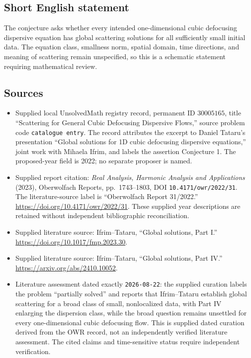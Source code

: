 \documentclass[11pt]{article}
\begin{document}
\subsection{Short English statement}
The conjecture asks whether every intended one-dimensional cubic defocusing dispersive equation has global scattering solutions for all sufficiently small initial data. The equation class, smallness norm, spatial domain, time directions, and meaning of scattering remain unspecified, so this is a schematic statement requiring mathematical review.
\subsection{Sources}
\begin{itemize}
\item Supplied local UnsolvedMath registry record, permanent ID \(30005165\), title ``Scattering for General Cubic Defocusing Dispersive Flows,'' source problem code \texttt{catalogue entry}. The record attributes the excerpt to Daniel Tataru's presentation ``Global solutions for 1D cubic defocusing dispersive equations,'' joint work with Mihaela Ifrim, and labels the assertion Conjecture 1. The proposed-year field is 2022; no separate proposer is named.
\item Supplied report citation: \emph{Real Analysis, Harmonic Analysis and Applications} (2023), Oberwolfach Reports, pp.\ 1743--1803, DOI \texttt{10.4171/owr/2022/31}. The literature-source label is ``Oberwolfach Report 31/2022.'' \url{https://doi.org/10.4171/owr/2022/31}. These supplied year descriptions are retained without independent bibliographic reconciliation.
\item Supplied literature source: Ifrim--Tataru, ``Global solutions, Part I.'' \url{https://doi.org/10.1017/fmp.2023.30}.
\item Supplied literature source: Ifrim--Tataru, ``Global solutions, Part IV.'' \url{https://arxiv.org/abs/2410.10052}.
\item Literature assessment dated exactly \texttt{2026-08-22}: the supplied curation labels the problem ``partially solved'' and reports that Ifrim--Tataru establish global scattering for a broad class of small, nonlocalized data, with Part IV enlarging the dispersion class, while the broad question remains unsettled for every one-dimensional cubic defocusing flow. This is supplied dated curation derived from the OWR record, not an independently verified literature assessment. The cited claims and time-sensitive status require independent verification.
\end{itemize}
\end{document}
